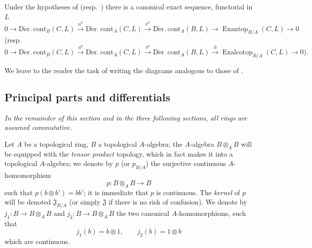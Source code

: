 \begin{corollary}[20.3.8]
\label{0.20.3.8}
Under the hypotheses of  \textup{(resp.\ )} there is a canonical exact sequence, functorial in $L$
\begin{equation}
\tag{20.3.8.1}
  \label{0.20.3.8.1}
  0\to\operatorname{D\acute{e}r.\ cont}_B(C,L)\xrightarrow{u^0}\operatorname{D\acute{e}r.\ cont}_A(C,L)\xrightarrow{v^0}\operatorname{D\acute{e}r.\ cont}_A(B,L)\to\operatorname{Exantop}_{B/A}(C,L)\to 0
\end{equation}
\textup{(resp.}
\begin{equation}
\tag{20.3.8.2}
  \label{0.20.3.8.2}
  0\to\operatorname{D\acute{e}r.\ cont}_B(C,L)\xrightarrow{u^0}\operatorname{D\acute{e}r.\ cont}_A(C,L)\xrightarrow{v^0}\operatorname{D\acute{e}r.\ cont}_A(B,L)\xrightarrow{\partial}\operatorname{Exalcotop}_{B/A}(C,L)\to 0\text{).}
\end{equation}
\end{corollary}

We leave to the reader the task of writing the diagrams analogous to those of .

\subsection{Principal parts and differentials}
\label{subsection:0.20.4}

\textit{In the remainder of this section and in the three following sections, all rings are assumed commutative.}

\begin{env}[20.4.1]
\label{0.20.4.1}
Let $A$ be a topological ring, $B$ a topological $A$-algebra; the $A$-algebra $B\otimes_A B$ will be equipped with the \emph{tensor product} topology, which in fact makes it into a topological $A$-algebra; we denote by $p$ (or $p_{B/A}$) the surjective continuous $A$-homomorphism
\begin{equation}
\tag{20.4.1.1}
  \label{0.20.4.1.1}
  p:B\otimes_A B\to B
\end{equation}
such that $p(b\otimes b')=bb'$; it is immediate that $p$ is continuous.
The \emph{kernel} of $p$ will be denoted $\mathfrak{J}_{B/A}$ (or simply $\mathfrak{J}$ if there is no risk of confusion).
We denote by $j_1:B\to B\otimes_A B$ and $j_2:B\to B\otimes_A B$ the two canonical $A$-homomorphisms, such that
\[
  j_1(b) = b\otimes 1, \qquad j_2(b) = 1\otimes b
\]
which are continuous.
\end{env}

